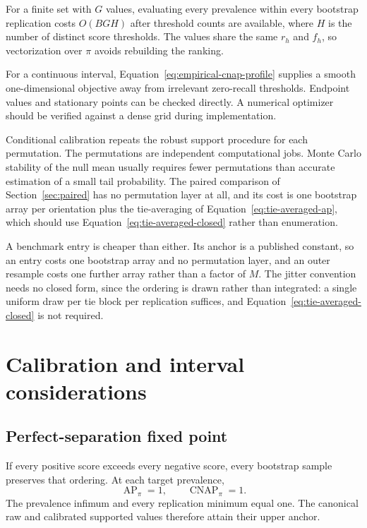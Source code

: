 \documentclass[11pt]{article}
\newcommand{\AP}{\operatorname{AP}}
\newcommand{\CNAP}{\operatorname{CNAP}}
\theoremstyle{remark}
\begin{document}
For a finite set with $G$ values, evaluating every prevalence within every bootstrap replication costs $O(BGH)$ after threshold counts are available, where $H$ is the number of distinct score thresholds. The values share the same $r_h$ and $f_h$, so vectorization over $\pi$ avoids rebuilding the ranking.

For a continuous interval, Equation~\eqref{eq:empirical-cnap-profile} supplies a smooth one-dimensional objective away from irrelevant zero-recall thresholds. Endpoint values and stationary points can be checked directly. A numerical optimizer should be verified against a dense grid during implementation.

Conditional calibration repeats the robust support procedure for each permutation. The permutations are independent computational jobs. Monte Carlo stability of the null mean usually requires fewer permutations than accurate estimation of a small tail probability. The paired comparison of Section~\ref{sec:paired} has no permutation layer at all, and its cost is one bootstrap array per orientation plus the tie-averaging of Equation~\eqref{eq:tie-averaged-ap}, which should use Equation~\eqref{eq:tie-averaged-closed} rather than enumeration.

A benchmark entry is cheaper than either. Its anchor is a published constant, so an entry costs one bootstrap array and no permutation layer, and an outer resample costs one further array rather than a factor of $M$. The jitter convention needs no closed form, since the ordering is drawn rather than integrated: a single uniform draw per tie block per replication suffices, and Equation~\eqref{eq:tie-averaged-closed} is not required.

\section{Calibration and interval considerations}
\label{app:calibration}

\subsection{Perfect-separation fixed point}

If every positive score exceeds every negative score, every bootstrap sample preserves that ordering. At each target prevalence,
\[
\AP_\pi=1,
\qquad
\CNAP_\pi=1.
\]
The prevalence infimum and every replication minimum equal one. The canonical raw and calibrated supported values therefore attain their upper anchor.
\end{document}
